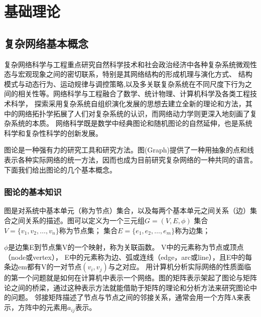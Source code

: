 \chapter{基础理论}
\section{复杂网络基本概念}
复杂网络科学与工程重点研究自然科学技术和社会政治经济中各种复杂系统微观性态与宏观现象之间的密切联系，特别是其网络结构的形成机理与演化方式、
结构模式与动态行为、运动规律与调控策略,以及多关联复杂系统在不同尺度下行为之间的相关性等。网络科学与工程融合了数学、统计物理、计算机科学及各类工程技术科学，
探索采用复杂系统自组织演化发展的思想去建立全新的理论和方法，其中的网络拓扑学拓展了人们对复杂系统的认识，而网络动力学则更深入地刻画了复杂系统的本质。
网络科学既是数学中经典图论和随机图论的自然延伸，也是系统科学和复杂性科学的创新发展。\par

图论是一种强有力的研究工具和研究方法。图(Graph)提供了一种用抽象的点和线表示各种实际网络的统一方法，因而也成为目前研究复杂网络的一种共同的语言。
下面我们给出图论的几个基本概念。
\subsection{图论的基本知识}
图是对系统中基本单元（称为节点）集合，以及每两个基本单元之间关系（边）集合之间关系的描述。图可以定义为一个三元组$G=(V,E,\phi)$
集合$V=\{v_1,v_2,…,v_n\}$称为节点集；
集合$E=\{e_1,e_2,…,e_m\}$称为边集；

$\phi$是边集E到节点集V的一个映射，称为关联函数。
V中的元素称为节点或顶点（node或vertex）， E中的元素称为边、弧或连线（edge，arc或line），且E中的每条边em都有V的一对节点$(v_i,v_j)$与之对应。
用计算机分析实际网络的性质面临的第一个问题就是如何在计算机中表示一个网络。图的矩阵表示架起了图论与矩阵论之间的桥梁，通过这种表示方法就能借助于矩阵的理论和分析方法来研究图论中的问题。
邻接矩阵描述了节点与节点之间的邻接关系，通常会用一个方阵A来表示，方阵中的元素用$a_{ij}$表示。          

